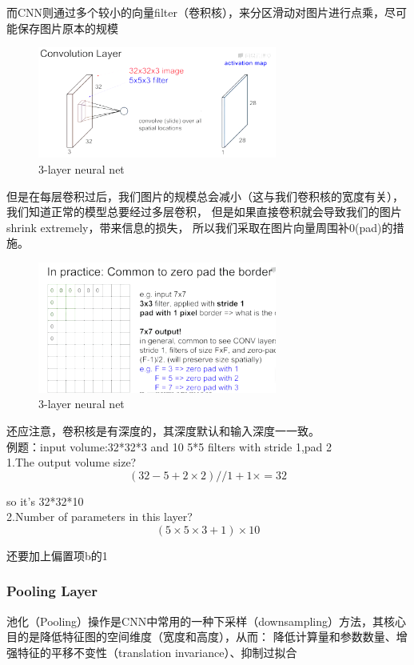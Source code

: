 \documentclass[12pt]{article}
\begin{document}
而CNN则通过多个较小的向量filter（卷积核），来分区滑动对图片进行点乘，尽可能保存图片原本的规模
 \begin{figure}[ht]  %
\centering
\includegraphics[width=0.7\textwidth]{pic11.png}
\caption{3-layer neural net}
\end{figure}
但是在每层卷积过后，我们图片的规模总会减小（这与我们卷积核的宽度有关），我们知道正常的模型总要经过多层卷积，
但是如果直接卷积就会导致我们的图片shrink extremely，带来信息的损失， 所以我们采取在图片向量周围补0(pad)的措施。
\begin{figure}[ht]  %
\centering
\includegraphics[width=0.7\textwidth]{pic12.png}
\caption{3-layer neural net}
\end{figure}

还应注意，卷积核是有深度的，其深度默认和输入深度一一致。
\\例题：input volume:32*32*3 and 10 5*5 filters with stride 1,pad 2
\\1.The output volume size?
\\$$(32-5+2\times2)//1+1\times=32$$

so it's 32*32*10
\\2.Number of parameters in this layer?
\\$$(5\times5\times3+1)\times10$$

还要加上偏置项b的1

\subsubsection{Pooling Layer}
池化（Pooling）操作是CNN中常用的一种下采样（downsampling）方法，其核心目的是降低特征图的空间维度（宽度和高度），从而：
降低计算量和参数数量、增强特征的平移不变性（translation invariance）、抑制过拟合
\end{document}

